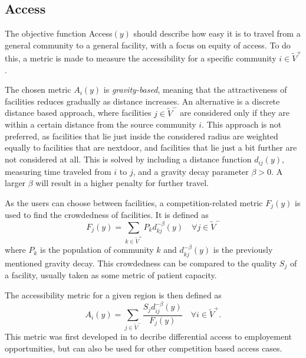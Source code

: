 \subsection{Access}\label{sec:access}
The objective function Access$(y)$ should describe how easy it is to travel from a general community to a general facility, with a focus on equity of access. To do this, a metric is made to measure the accessibility for a specific community $i\in \tilde V^+$.

The chosen metric $A_i(y)$ is \emph{gravity-based}, meaning that the attractiveness of facilities reduces gradually as distance increases. An alternative is a discrete distance based approach, where facilities $j\in \tilde V^-$ are considered only if they are within a certain distance from the source community $i$. This approach is not preferred, as facilities that lie just inside the considered radius are weighted equally to facilities that are nextdoor, and facilities that lie just a bit further are not considered at all. This is solved by including a distance function $d_{ij}(y)$, measuring time traveled from $i$ to $j$, and a gravity decay parameter $\beta >0$. A larger $\beta$ will result in a higher penalty for further travel. %

As the users can choose between facilities, a competition-related metric $F_j(y)$ is used to find the crowdedness of facilities. It is defined as
\begin{equation*}
    F_j(y) = \sum_{k\in \tilde V^+} P_k d_{kj}^{-\beta}(y) \quad \forall j\in \tilde V^-
\end{equation*}
where $P_k$ is the population of community $k$ and $d_{kj}^{-\beta}(y)$ is the previously mentioned gravity decay. This crowdedness can be compared to the quality $S_j$ of a facility, usually taken as some metric of patient capacity.

The accessibility metric for a given region is then defined as
\begin{equation*}
    A_i(y) = \sum_{j\in\tilde V^-} \frac{S_j d_{ij}^{-\beta}(y)}{F_j(y)}\quad \forall i \in \tilde V^+.
\end{equation*}
This metric was first developed in \cite{weibull} to decribe differential access to employement opportunities, but can also be used for other competition based access cases.

\newcommand{\K}{\mathcal{K}}

